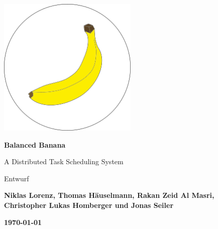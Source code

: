 \begin{titlepage}
    \begin{center}
    
     \vspace*{0.8cm}
 
        \includegraphics[width=0.5\textwidth]{balancedbanana}
        \vspace*{1cm}
 
        \Huge
        \textbf{Balanced Banana}
 
        \vspace{0.5cm}
        \LARGE
        A Distributed Task Scheduling System
        
        \vspace{0.5 cm}
        \LARGE
        Entwurf
 
        \vspace{1.5cm}

        \large
        \textbf{Niklas Lorenz, Thomas Häuselmann, Rakan Zeid Al Masri, Christopher Lukas Homberger und Jonas Seiler}
 
        \vspace*{0.5cm}

        \textbf{\today}
 
       
        
 
    \end{center}
\end{titlepage}